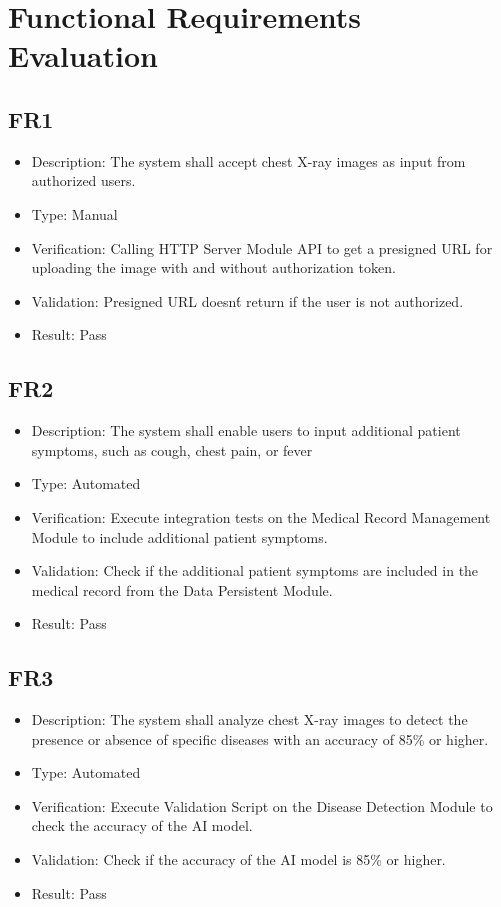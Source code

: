 \documentclass[12pt, titlepage]{article}
\begin{document}
\newpage


\section{Functional Requirements Evaluation}
\subsection{FR1}
\begin{itemize}
  \item Description: The system shall accept chest X-ray images as input from authorized users.
  \item Type: Manual
  \item Verification: Calling HTTP Server Module API to get a presigned URL for uploading the image with and without authorization token.
  \item Validation: Presigned URL doesn\'t return if the user is not authorized.
  \item Result: Pass
\end{itemize}

\subsection{FR2}
\begin{itemize}
  \item Description: The system shall enable users to input additional patient symptoms, such as cough, chest pain, or fever
  \item Type: Automated
  \item Verification: Execute integration tests on the Medical Record Management Module to include additional patient symptoms.
  \item Validation: Check if the additional patient symptoms are included in the medical record from the Data Persistent Module.
  \item Result: Pass
\end{itemize}

\subsection{FR3}
\begin{itemize}  
  \item Description: The system shall analyze chest X-ray images to detect the presence or absence of specific diseases with an accuracy of 85\% or higher.
  \item Type: Automated
  \item Verification: Execute Validation Script on the Disease Detection Module to check the accuracy of the AI model.
  \item Validation: Check if the accuracy of the AI model is 85\% or higher.
  \item Result: Pass
\end{itemize}
\end{document}
